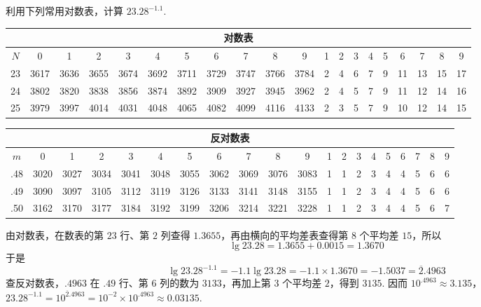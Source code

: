 \begin{problem}
利用下列常用对数表，计算 \(23.28^{-1.1}\).

\begin{center}
\scriptsize
\setlength{\tabcolsep}{3pt}
\renewcommand{\arraystretch}{1.1}
\begin{tabular}{|c|cccccccccc|ccccccccc|}
\hline
\multicolumn{20}{|c|}{对数表} \\
\hline
\(N\) & 0 & 1 & 2 & 3 & 4 & 5 & 6 & 7 & 8 & 9 & 1 & 2 & 3 & 4 & 5 & 6 & 7 & 8 & 9 \\
\hline
23 & 3617 & 3636 & 3655 & 3674 & 3692 & 3711 & 3729 & 3747 & 3766 & 3784 & 2 & 4 & 6 & 7 & 9 & 11 & 13 & 15 & 17 \\
24 & 3802 & 3820 & 3838 & 3856 & 3874 & 3892 & 3909 & 3927 & 3945 & 3962 & 2 & 4 & 5 & 7 & 9 & 11 & 12 & 14 & 16 \\
25 & 3979 & 3997 & 4014 & 4031 & 4048 & 4065 & 4082 & 4099 & 4116 & 4133 & 2 & 3 & 5 & 7 & 9 & 10 & 12 & 14 & 15 \\
\hline
\end{tabular}

\vspace{0.8em}

\begin{tabular}{|c|cccccccccc|ccccccccc|}
\hline
\multicolumn{20}{|c|}{反对数表} \\
\hline
\(m\) & 0 & 1 & 2 & 3 & 4 & 5 & 6 & 7 & 8 & 9 & 1 & 2 & 3 & 4 & 5 & 6 & 7 & 8 & 9 \\
\hline
.48 & 3020 & 3027 & 3034 & 3041 & 3048 & 3055 & 3062 & 3069 & 3076 & 3083 & 1 & 1 & 2 & 3 & 4 & 4 & 5 & 6 & 6 \\
.49 & 3090 & 3097 & 3105 & 3112 & 3119 & 3126 & 3133 & 3141 & 3148 & 3155 & 1 & 1 & 2 & 3 & 4 & 4 & 5 & 6 & 6 \\
.50 & 3162 & 3170 & 3177 & 3184 & 3192 & 3199 & 3206 & 3214 & 3221 & 3228 & 1 & 1 & 2 & 3 & 4 & 4 & 5 & 6 & 7 \\
\hline
\end{tabular}
\end{center}
\end{problem}

\begin{solution}
由对数表，在数表的第 \(23\) 行、第 \(2\) 列查得 \(1.3655\)，再由横向的平均差表查得第 \(8\) 个平均差 \(15\)，所以
\[
\lg 23.28=1.3655+0.0015=1.3670
\]
于是
\[
\lg 23.28^{-1.1}=-1.1\lg 23.28=-1.1\times1.3670=-1.5037
=\overline{2}.4963
\]
查反对数表，\(.4963\) 在 \(.49\) 行、第 \(6\) 列的数为 \(3133\)，再加上第 \(3\) 个平均差 \(2\)，得到 \(3135\). 因而
\(10^{.4963}\approx3.135\)，\(23.28^{-1.1}=10^{\overline{2}.4963} =10^{-2}\times10^{.4963}\approx0.03135\).
\end{solution}

